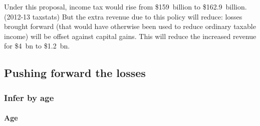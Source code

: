 \documentclass{grattan}\usepackage[]{graphicx}\usepackage[]{color}
\begin{document}
Under this proposal, income tax would rise from \$159~billion to \$162.9~billion. (2012-13 taxstats) But the extra revenue due to this policy will reduce: losses brought forward (that would have otherwise been used to reduce ordinary taxable income) will be offset against capital gains. This will reduce the increased revenue for \$4~bn to \$1.2~bn.
%
\subsection{Pushing forward the losses}
\subsubsection{Infer by age}
\paragraph{Age}
\end{document}
